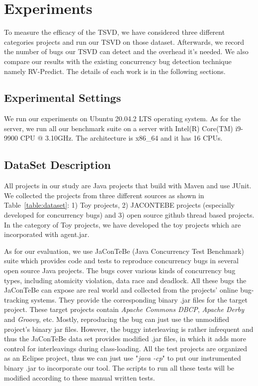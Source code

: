 \section{Experiments}
\label{sec:experiment}
To measure the efficacy of the TSVD, we have considered three different categories projects and run our TSVD on those dataset. Afterwards, we record the number of bugs our TSVD can detect and the overhead it's needed. We also compare our results with the existing concurrency bug detection technique namely RV-Predict. The details of each work is in the following sections.

\subsection{Experimental Settings}
We run our experiments on Ubuntu 20.04.2 LTS operating system. As for the
server, we run all our benchmark suite on a server with Intel(R) Core(TM)
i9-9900 CPU @ 3.10GHz. The architecture is x86\_64 and it has 16 CPUs.

\subsection{DataSet Description} 
All projects in our study are Java projects that build with
Maven \cite{maven} and use JUnit. 
We collected the projects from three different sources as shown in Table~\ref{table:dataset}: 1) Toy
projects, 2) JACONTEBE projects (especially developed for concurrency bugs) and
3) open source github thread based projects. In the category of Toy projects, we
have developed the toy projects which are incorporated with agent.jar.

As for our evaluation, we use JaConTeBe (Java Concurrency Test Benchmark) suite
which provides code and tests to reproduce concurrency bugs in several open
source Java projects. The bugs cover various kinds of concurrency bug types,
including atomicity violation, data race and deadlock. All these bugs the JaConTeBe can expose are real world and collected from the
projects' online bug-tracking systems. They provide the corresponding binary
.jar files for the target project. These target projects contain \textit{Apache
Commons DBCP}, \textit{Apache Derby} and \textit{Groovy}, etc. Mostly,
reproducing the bug can just use the unmodified project's binary jar files.
However, the buggy interleaving is rather infrequent and thus the JaConTeBe
data set provides modified .jar files, in which it adds more control for
interleavings during class-loading. All the test projects are organized as an
Eclipse project, thus we can just use "\textit{java -cp}" to put our
instrumented binary .jar to incorporate our tool. The scripts to run all these
tests will be modified according to these manual written tests.

